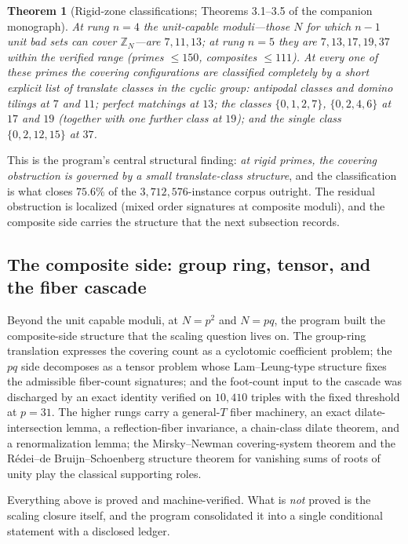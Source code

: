 \documentclass[11pt,a4paper]{article}
\numberwithin{equation}{section}
\theoremstyle{plain}
\newtheorem{theorem}{Theorem}[section]
\theoremstyle{definition}
\theoremstyle{remark}
\newcommand{\Z}{\mathbb{Z}}
\begin{document}
\begin{theorem}[Rigid-zone classifications; Theorems 3.1--3.5 of the
companion monograph]\label{thm:rigid}
At rung $n=4$ the unit-capable moduli---those $N$ for which $n-1$ unit
bad sets can cover $\Z_N$---are $7,11,13$; at rung $n=5$ they are
$7,13,17,19,37$ within the verified range (primes $\le150$, composites
$\le111$). At every one of these primes the covering configurations are
classified completely by a short explicit list of translate classes in
the cyclic group: antipodal classes and domino tilings at $7$ and $11$;
perfect matchings at $13$; the classes $\{0,1,2,7\}$, $\{0,2,4,6\}$ at
$17$ and $19$ (together with one further class at $19$); and the single
class $\{0,2,12,15\}$ at $37$.
\end{theorem}

This is the program's central structural finding: \emph{at rigid primes,
the covering obstruction is governed by a small translate-class
structure}, and the classification is what closes $75.6\%$ of the
$3{,}712{,}576$-instance corpus outright. The residual obstruction is
localized (mixed order signatures at composite moduli), and the composite
side carries the structure that the next subsection records.

\subsection{The composite side: group ring, tensor, and the fiber
cascade}

Beyond the unit capable moduli, at $N=p^2$ and $N=pq$, the program built
the composite-side structure that the scaling question lives on. The
group-ring translation expresses the covering count as a cyclotomic
coefficient problem; the $pq$ side decomposes as a tensor problem whose
Lam--Leung-type structure \cite{LamLeung} fixes the admissible
fiber-count signatures; and the foot-count input to the cascade was
discharged by an exact identity verified on $10{,}410$ triples with the
fixed threshold at $p=31$. The higher rungs carry a general-$T$ fiber
machinery, an exact dilate-intersection lemma, a reflection-fiber
invariance, a chain-class dilate theorem, and a renormalization lemma;
the Mirsky--Newman covering-system theorem and the
R\'edei--de Bruijn--Schoenberg structure theorem for vanishing sums of
roots of unity \cite{MirskyNewman,LamLeung} play the classical
supporting roles.

Everything above is proved and machine-verified. What is \emph{not}
proved is the scaling closure itself, and the program consolidated it
into a single conditional statement with a disclosed ledger.
\end{document}
